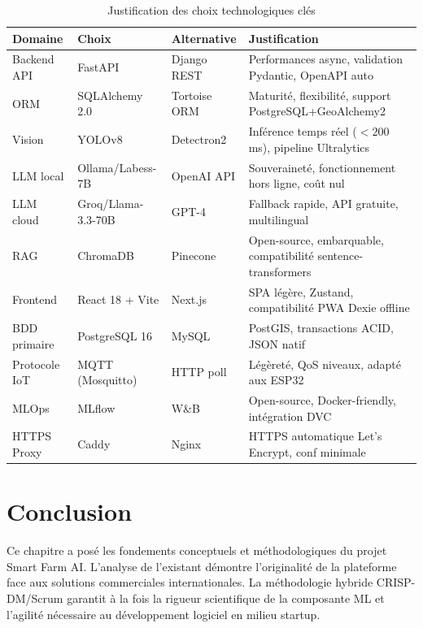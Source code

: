 \documentclass[12pt,a4paper,twoside]{report}
\begin{document}
\begin{table}[H]
\centering
\caption{Justification des choix technologiques clés}
\label{tab:choix_tech}
\begin{tabularx}{\linewidth}{lllX}
\toprule
\textbf{Domaine} & \textbf{Choix} & \textbf{Alternative} & \textbf{Justification} \\
\midrule
Backend API  & FastAPI  & Django REST & Performances async, validation Pydantic, OpenAPI auto \\
ORM          & SQLAlchemy 2.0 & Tortoise ORM & Maturité, flexibilité, support PostgreSQL+GeoAlchemy2 \\
Vision       & YOLOv8  & Detectron2  & Inférence temps réel ($<200$\,ms), pipeline Ultralytics \\
LLM local    & Ollama/Labess-7B & OpenAI API & Souveraineté, fonctionnement hors ligne, coût nul \\
LLM cloud    & Groq/Llama-3.3-70B & GPT-4 & Fallback rapide, API gratuite, multilingual \\
RAG          & ChromaDB & Pinecone    & Open-source, embarquable, compatibilité sentence-transformers \\
Frontend     & React 18 + Vite & Next.js & SPA légère, Zustand, compatibilité PWA Dexie offline \\
BDD primaire & PostgreSQL 16 & MySQL & PostGIS, transactions ACID, JSON natif \\
Protocole IoT& MQTT (Mosquitto) & HTTP poll & Légèreté, QoS niveaux, adapté aux ESP32 \\
MLOps        & MLflow  & W\&B        & Open-source, Docker-friendly, intégration DVC \\
HTTPS Proxy  & Caddy   & Nginx       & HTTPS automatique Let's Encrypt, conf minimale \\
\bottomrule
\end{tabularx}
\end{table}

\section*{Conclusion}
Ce chapitre a posé les fondements conceptuels et méthodologiques du projet
Smart Farm AI. L'analyse de l'existant démontre l'originalité de la plateforme
face aux solutions commerciales internationales. La méthodologie hybride
CRISP-DM/Scrum garantit à la fois la rigueur scientifique de la composante
ML et l'agilité nécessaire au développement logiciel en milieu startup.
\end{document}
